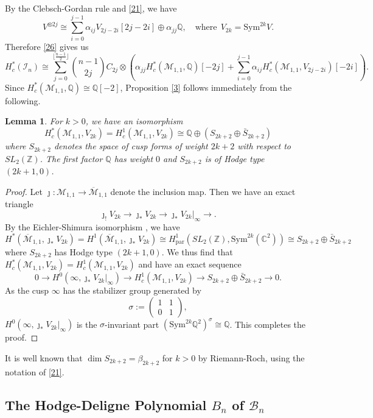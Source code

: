 \documentclass[11pt]{amsart}
\numberwithin{equation}{section}
\newtheorem{lemm}[theo]{Lemma}
\theoremstyle{definition}
\newcommand{\CC}{\mathbb{C}}
\newcommand{\QQ}{\mathbb{Q}}
\newcommand{\ZZ}{\mathbb{Z}}
\def\cB{{\mathcal B}}
\def\cM{{\mathcal M}}
\def\cI{{\mathcal I}}
\def\lra{\longrightarrow }
\def\beq{\begin{equation}}
\def\eeq{\end{equation}}
\def\bcM{\overline{\cM}}
\begin{document}
By the Clebsch-Gordan rule and \eqref{21}, we have 
$$V^{\otimes 2j}\cong \sum_{i=0}^{j-1} \alpha_{ij} V_{2j-2i}[2j-2i]\oplus \alpha_{jj}\QQ, \quad \text{where} \ \ V_{2k}=\mathrm{Sym}^{2k}V.$$
Therefore \eqref{26} gives us 
\beq\label{27}
H^*_c(\cI_n)\cong 
\sum_{j=0}^{\lfloor \frac{n-1}{2}\rfloor} \binom{n-1}{2j}  C_{2j}\otimes 
\left( \alpha_{jj}H^*_c(\cM_{1,1},\QQ)[-2j]+\sum_{i=0}^{j-1} \alpha_{ij} H^*_c(\cM_{1,1},V_{2j-2i})[-2i]\right).\eeq
Since $H^*_c(\cM_{1,1},\QQ)\cong \QQ[-2]$, Proposition \ref{3} follows immediately from the following.

\begin{lemm}\label{35} For $k>0$, we have an isomorphism
    $$H^*_c(\cM_{1,1},V_{2k})=H^1_c(\cM_{1,1},V_{2k})\cong \QQ\oplus (S_{2k+2}\oplus \bar S_{2k+2})$$
where $S_{2k+2}$ denotes the space of cusp forms of weight $2k+2$ with respect to $SL_2(\ZZ)$. The first factor $\QQ$ has weight $0$ and  $S_{2k+2}$ is of Hodge type $(2k+1,0)$. 
\end{lemm}
\begin{proof}
    Let $\jmath:\cM_{1,1}\to \bcM_{1,1}$ denote the inclusion map. Then we have an exact triangle
    $$\jmath_!V_{2k}\lra \jmath_*V_{2k}\lra \jmath_*V_{2k}|_\infty\lra .$$
    By the Eichler-Shimura isomorphism \cite[Theorem 8.4]{Shi}, we have 
    $$H^*(\bcM_{1,1},\jmath_*V_{2k})=H^1(\bcM_{1,1},\jmath_*V_{2k})\cong H^1_{\mathrm{par}}(SL_2(\ZZ),\mathrm{Sym}^{2k}(\CC^2))\cong S_{2k+2}\oplus \bar S_{2k+2}$$ where $S_{2k+2}$ has Hodge type $(2k+1,0)$. 
    We thus find that $H^*_c(\cM_{1,1},V_{2k})=H^1_c(\cM_{1,1},V_{2k})$ and have an exact sequence
\[    0\lra H^0(\infty,\jmath_*V_{2k}|_\infty)\lra H^1_c(\cM_{1,1},V_{2k})\lra S_{2k+2}\oplus \bar S_{2k+2} \lra 0 .\]
As the cusp $\infty$ has the stabilizer group generated by
\[\sigma:=\left( \begin{matrix}
1&1\\ 0&1    
\end{matrix}\right),\]
$H^0(\infty,\jmath_*V_{2k}|_\infty)$ is the $\sigma$-invariant part $(\mathrm{Sym}^{2k}\QQ^2)^\sigma\cong \QQ$. This completes the proof. 
\end{proof}
It is well known that $\dim S_{2k+2}=\beta_{2k+2}$ for $k>0$ by Riemann-Roch, using the notation of \eqref{21}.  

\medskip





\subsection{The Hodge-Deligne Polynomial $B_n$ of $\cB_n$}
\end{document}

